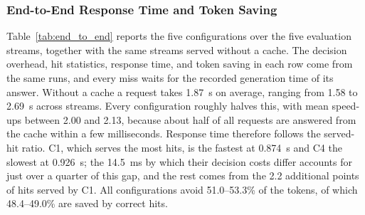 \documentclass[authoryear,preprint,review,12pt]{elsarticle}
\begin{document}
\subsubsection{End-to-End Response Time and Token Saving}
\label{subsubsec:end_to_end}
Table~\ref{tab:end_to_end} reports the five configurations over the five evaluation streams, together with the same streams served without a cache. The decision overhead, hit statistics, response time, and token saving in each row come from the same runs, and every miss waits for the recorded generation time of its answer. Without a cache a request takes 1.87~s on average, ranging from 1.58 to 2.69~s across streams. Every configuration roughly halves this, with mean speed-ups between 2.00 and 2.13, because about half of all requests are answered from the cache within a few milliseconds. Response time therefore follows the served-hit ratio. C1, which serves the most hits, is the fastest at 0.874~s and C4 the slowest at 0.926~s; the 14.5~ms by which their decision costs differ accounts for just over a quarter of this gap, and the rest comes from the 2.2 additional points of hits served by C1. All configurations avoid 51.0--53.3\% of the tokens, of which 48.4--49.0\% are saved by correct hits.

\begin{table}[htbp]
\centering
\caption{End-to-end results over the five evaluation streams: mean, with the 95\% $t$-interval across streams for the served-hit ratio and hit precision. Every miss waits for the recorded generation time of its answer. Decision overhead covers work up to the hit-or-miss commitment; token saving and correct-only saving follow Eq.~(\ref{eq:token_saving}).}
\label{tab:end_to_end}
\end{table}
\end{document}
